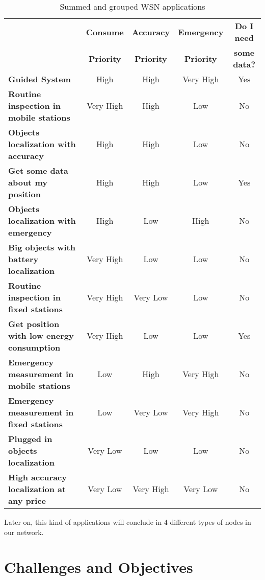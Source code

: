 \begin{table}[ht]\footnotesize
\begin{center}
 \begin{tabular}{l||cccc}
  \noalign{\vspace*{0.5cm}}
  & \textbf{Consume} & \textbf{Accuracy} & \textbf{Emergency} & \textbf{Do I need} \\
  & \textbf{Priority} & \textbf{Priority} & \textbf{Priority} & \textbf{some data?} \\
  \hline\hline
  \textbf{Guided System} & High & High & Very High & Yes \\
  \hline 
  \textbf{Routine inspection in mobile stations} & Very High & High & Low & No \\
  \hline
  \textbf{Objects localization with accuracy} & High & High & Low & No \\
  \hline
  \textbf{Get some data about my position} & High & High & Low & Yes \\
  \hline
  \textbf{Objects localization with emergency} & High & Low & High & No \\
  \hline
  \textbf{Big objects with battery localization} & Very High & Low & Low & No \\
  \hline
  \textbf{Routine inspection in fixed stations} & Very High & Very Low & Low & No \\
  \hline
  \textbf{Get position with low energy consumption} & Very High & Low & Low & Yes \\
  \hline
  \textbf{Emergency measurement in mobile stations} & Low & High & Very High & No \\
  \hline
  \textbf{Emergency measurement in fixed stations} & Low & Very Low & Very High & No \\
  \hline
  \textbf{Plugged in objects localization} & Very Low & Low & Low & No \\
  \hline
  \textbf{High accuracy localization at any price} & Very Low & Very High & Very Low & No \\
  \hline
  \end{tabular}
 \caption{Summed and grouped \ac{WSN} applications}
 \label{tab:wsn_applications}
\end{center}
\end{table}

Later on, this kind of applications will conclude in 4 different types of nodes in our network.

\section{Challenges and Objectives}

